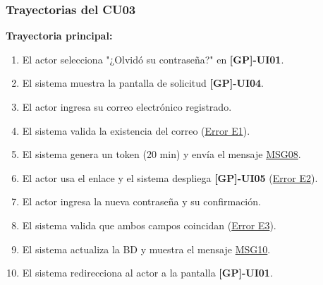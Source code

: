 \begin{appendices}
\subsubsection{Trayectorias del CU03}
\textbf{Trayectoria principal:}
\begin{enumerate}[nosep]
    \item El actor selecciona "¿Olvidó su contraseña?" en \textbf{[GP]-UI01}.
    \item El sistema muestra la pantalla de solicitud \textbf{[GP]-UI04}.
    \item El actor ingresa su correo electrónico registrado.
    \item El sistema valida la existencia del correo (\hyperlink{msg:MSG03}{Error E1}).
    \item El sistema genera un token (20 min) y envía el mensaje \hyperlink{msg:MSG08}{MSG08}.
    \item El actor usa el enlace y el sistema despliega \textbf{[GP]-UI05} (\hyperlink{err:E6}{Error E2}).
    \item El actor ingresa la nueva contraseña y su confirmación.
    \item El sistema valida que ambos campos coincidan (\hyperlink{err:E3}{Error E3}).
    \item El sistema actualiza la BD y muestra el mensaje \hyperlink{msg:MSG10}{MSG10}.
    \item El sistema redirecciona al actor a la pantalla \textbf{[GP]-UI01}.
\end{enumerate}


\end{appendices}
